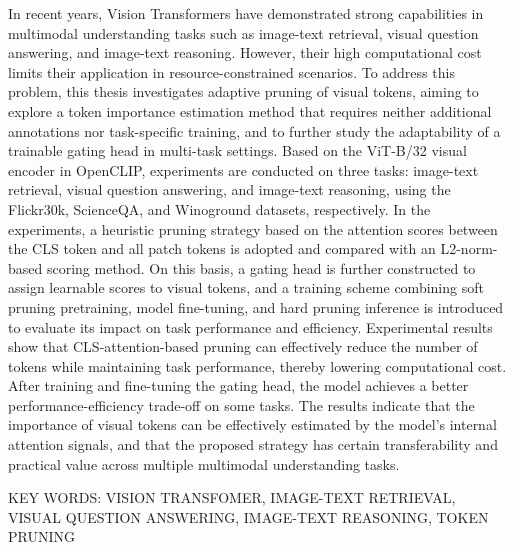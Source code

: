 \documentclass{article}
\let\bfseries\mdseries
\begin{document}
	\begingroup
	\raggedright
	\fontsize{12}{20}\selectfont
	\setlength{\baselineskip}{20pt}
	\setlength{\parindent}{0pt} %
	In recent years, Vision Transformers have demonstrated strong capabilities in multimodal understanding tasks such as image-text retrieval, visual question answering, and image-text reasoning. However, their high computational cost limits their application in resource-constrained scenarios. To address this problem, this thesis investigates adaptive pruning of visual tokens, aiming to explore a token importance estimation method that requires neither additional annotations nor task-specific training, and to further study the adaptability of a trainable gating head in multi-task settings. Based on the ViT-B/32 visual encoder in OpenCLIP, experiments are conducted on three tasks: image-text retrieval, visual question answering, and image-text reasoning, using the Flickr30k, ScienceQA, and Winoground datasets, respectively. In the experiments, a heuristic pruning strategy based on the attention scores between the CLS token and all patch tokens is adopted and compared with an L2-norm-based scoring method. On this basis, a gating head is further constructed to assign learnable scores to visual tokens, and a training scheme combining soft pruning pretraining, model fine-tuning, and hard pruning inference is introduced to evaluate its impact on task performance and efficiency. Experimental results show that CLS-attention-based pruning can effectively reduce the number of tokens while maintaining task performance, thereby lowering computational cost. After training and fine-tuning the gating head, the model achieves a better performance-efficiency trade-off on some tasks. The results indicate that the importance of visual tokens can be effectively estimated by the model’s internal attention signals, and that the proposed strategy has certain transferability and practical value across multiple multimodal understanding tasks.
	\par
	\endgroup
	\vspace{1em}
	
	\raggedright
	\begingroup
	\fontsize{16}{19}\bfseries KEY WORDS:
	\fontsize{12}{15}\selectfont VISION TRANSFOMER, IMAGE-TEXT RETRIEVAL, VISUAL QUESTION ANSWERING, IMAGE-TEXT REASONING, TOKEN PRUNING
	\endgroup
	
	\newpage
	\setcounter{page}{1}          %
	\pagestyle{mainstyle}         %
	
\end{document}
